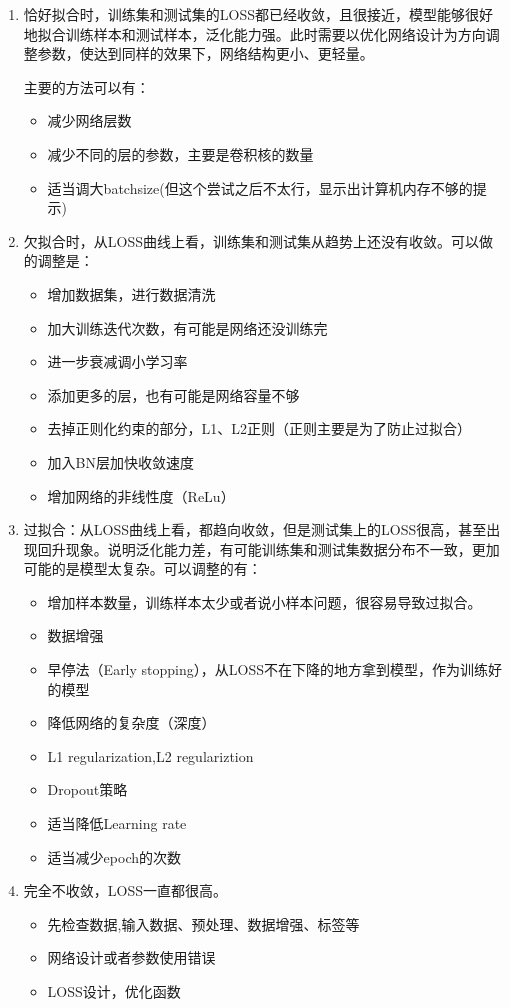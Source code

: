 \documentclass{article}
\begin{document}
	\begin{enumerate}
		\item 恰好拟合时，训练集和测试集的LOSS都已经收敛，且很接近，模型能够很好地拟合训练样本和测试样本，泛化能力强。此时需要以优化网络设计为方向调整参数，使达到同样的效果下，网络结构更小、更轻量。
		
		主要的方法可以有：
		\begin{itemize}
			\item 减少网络层数
			\item 减少不同的层的参数，主要是卷积核的数量
			\item 适当调大batchsize(但这个尝试之后不太行，显示出计算机内存不够的提示)
		\end{itemize}
	
		\item 欠拟合时，从LOSS曲线上看，训练集和测试集从趋势上还没有收敛。可以做的调整是：
		
		\begin{itemize}
			\item 增加数据集，进行数据清洗
			\item 加大训练迭代次数，有可能是网络还没训练完
			\item 进一步衰减调小学习率
			\item 添加更多的层，也有可能是网络容量不够
			\item 去掉正则化约束的部分，L1、L2正则（正则主要是为了防止过拟合）
			\item 加入BN层加快收敛速度
			\item 增加网络的非线性度（ReLu）
		\end{itemize}
	
		\item 过拟合：从LOSS曲线上看，都趋向收敛，但是测试集上的LOSS很高，甚至出现回升现象。说明泛化能力差，有可能训练集和测试集数据分布不一致，更加可能的是模型太复杂。可以调整的有：
		
		\begin{itemize}
			\item 增加样本数量，训练样本太少或者说小样本问题，很容易导致过拟合。
			\item 数据增强
			\item 早停法（Early stopping），从LOSS不在下降的地方拿到模型，作为训练好的模型
			\item 降低网络的复杂度（深度）
			\item L1 regularization,L2 regulariztion
			\item Dropout策略
			\item 适当降低Learning rate
			\item 适当减少epoch的次数
		\end{itemize}
		
		\item 完全不收敛，LOSS一直都很高。
			\begin{itemize}
				\item 先检查数据,输入数据、预处理、数据增强、标签等
				\item 网络设计或者参数使用错误
				\item LOSS设计，优化函数
			\end{itemize}
	\end{enumerate}
\end{document}
